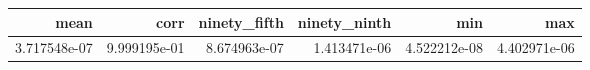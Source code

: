 \begin{tabular}{rrrrrr}
\toprule
mean & corr & ninety_fifth & ninety_ninth & min & max \\
\midrule
3.717548e-07 & 9.999195e-01 & 8.674963e-07 & 1.413471e-06 & 4.522212e-08 & 4.402971e-06 \\
\bottomrule
\end{tabular}
